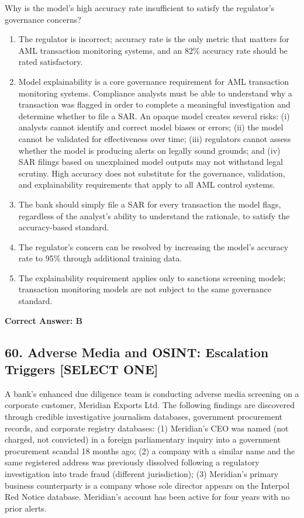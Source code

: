 \documentclass[11pt,a4paper]{article}
\begin{document}
	Why is the model's high accuracy rate insufficient to satisfy the regulator's governance concerns?
	
	\begin{enumerate}[label=\Alph*.]
		\item The regulator is incorrect; accuracy rate is the only metric that matters for AML transaction monitoring systems, and an 82\% accuracy rate should be rated satisfactory.
		\item Model explainability is a core governance requirement for AML transaction monitoring systems. Compliance analysts must be able to understand why a transaction was flagged in order to complete a meaningful investigation and determine whether to file a SAR. An opaque model creates several risks: (i) analysts cannot identify and correct model biases or errors; (ii) the model cannot be validated for effectiveness over time; (iii) regulators cannot assess whether the model is producing alerts on legally sound grounds; and (iv) SAR filings based on unexplained model outputs may not withstand legal scrutiny. High accuracy does not substitute for the governance, validation, and explainability requirements that apply to all AML control systems.
		\item The bank should simply file a SAR for every transaction the model flags, regardless of the analyst's ability to understand the rationale, to satisfy the accuracy-based standard.
		\item The regulator's concern can be resolved by increasing the model's accuracy rate to 95\% through additional training data.
		\item The explainability requirement applies only to sanctions screening models; transaction monitoring models are not subject to the same governance standard.
	\end{enumerate}
	\textbf{Correct Answer: B}
	
	\subsection{60. Adverse Media and OSINT: Escalation Triggers \textnormal{[SELECT ONE]}}
	
	A bank's enhanced due diligence team is conducting adverse media screening on a corporate customer, Meridian Exports Ltd. The following findings are discovered through credible investigative journalism databases, government procurement records, and corporate registry databases: (1) Meridian's CEO was named (not charged, not convicted) in a foreign parliamentary inquiry into a government procurement scandal 18 months ago; (2) a company with a similar name and the same registered address was previously dissolved following a regulatory investigation into trade fraud (different jurisdiction); (3) Meridian's primary business counterparty is a company whose sole director appears on the Interpol Red Notice database. Meridian's account has been active for four years with no prior alerts.
	
\end{document}
